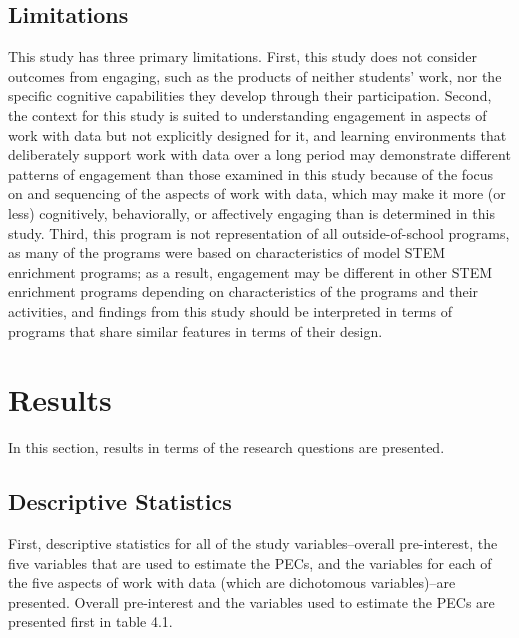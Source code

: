 \documentclass[]{msu-thesis}
\theoremstyle{definition}
\theoremstyle{definition}
\theoremstyle{definition}
\theoremstyle{remark}
\begin{document}
\section{Limitations}\label{limitations}

This study has three primary limitations. First, this study does not
consider outcomes from engaging, such as the products of neither
students' work, nor the specific cognitive capabilities they develop
through their participation. Second, the context for this study is
suited to understanding engagement in aspects of work with data but not
explicitly designed for it, and learning environments that deliberately
support work with data over a long period may demonstrate different
patterns of engagement than those examined in this study because of the
focus on and sequencing of the aspects of work with data, which may make
it more (or less) cognitively, behaviorally, or affectively engaging
than is determined in this study. Third, this program is not
representation of all outside-of-school programs, as many of the
programs were based on characteristics of model STEM enrichment
programs; as a result, engagement may be different in other STEM
enrichment programs depending on characteristics of the programs and
their activities, and findings from this study should be interpreted in
terms of programs that share similar features in terms of their design.

\chapter{Results}\label{results}

In this section, results in terms of the research questions are
presented.

\section{Descriptive Statistics}\label{descriptive-statistics}

First, descriptive statistics for all of the study variables--overall
pre-interest, the five variables that are used to estimate the PECs, and
the variables for each of the five aspects of work with data (which are
dichotomous variables)--are presented. Overall pre-interest and the
variables used to estimate the PECs are presented first in table 4.1.
\end{document}
